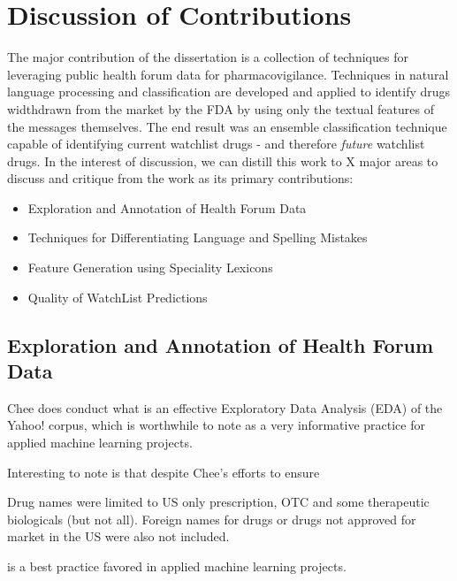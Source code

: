 \documentclass[twoside,11pt]{article}
\begin{document}
\section{Discussion of Contributions}
The major contribution of the dissertation is a collection of techniques for leveraging public health forum data for pharmacovigilance. Techniques in natural language processing and classification are developed and applied to identify drugs widthdrawn from the market by the FDA by using only the textual features of the messages themselves. The end result was an ensemble classification technique capable of identifying current watchlist drugs - and therefore \textit{future} watchlist drugs.  In the interest of discussion, we can distill this work to X major areas to discuss and critique from the work as its primary contributions:
\begin{itemize}
  \item Exploration and Annotation of Health Forum Data
  \item Techniques for Differentiating Language and Spelling Mistakes
  \item Feature Generation using Speciality Lexicons
  \item Quality of WatchList Predictions
\end{itemize}

\subsection{Exploration and Annotation of Health Forum Data}
Chee does conduct what is an effective Exploratory Data Analysis (EDA) of the Yahoo! corpus, which is worthwhile to note as a very informative practice for applied machine learning projects.

Interesting to note is that despite Chee's efforts to ensure

Drug names were limited to US only prescription, OTC and some therapeutic biologicals (but not all).  Foreign names for drugs or drugs not approved for market in the US were also not included.


is a best practice favored in applied machine learning projects.
\end{document}
